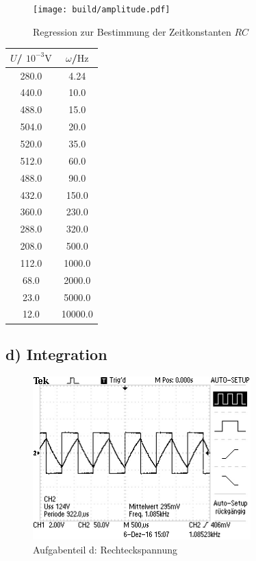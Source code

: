 \begin{figure}
  \centering
  \texttt{[image: build/amplitude.pdf]}
  \caption{Regression zur Bestimmung der Zeitkonstanten $RC$}
  \label{fig:plota}
\end{figure}
\begin{table}
  \centering

\begin{tabular}{cc}
  \toprule
$U$/ $10^{-3} \si{\volt}$ & $\omega$/$\si{\Hz}$ \\
\midrule
280.0 & 4.24 \\
440.0 & 10.0 \\
488.0 & 15.0 \\
504.0 & 20.0 \\
520.0 & 35.0 \\
512.0 & 60.0 \\
488.0 & 90.0 \\
432.0 & 150.0 \\
360.0 & 230.0 \\
288.0 & 320.0 \\
208.0 & 500.0 \\
112.0 & 1000.0 \\
68.0 & 2000.0 \\
23.0 & 5000.0 \\
12.0 & 10000.0 \\
\bottomrule
\end{tabular}
\end{table}

\subsection{d) Integration}

\begin{figure}
	\centering
	\includegraphics[width=0.75\textwidth]{bilder/ALL0001/F0001TEK.JPG}
	\caption{Aufgabenteil d: Rechteckspannung}
	\label{fig:rechteck}
\end{figure}

